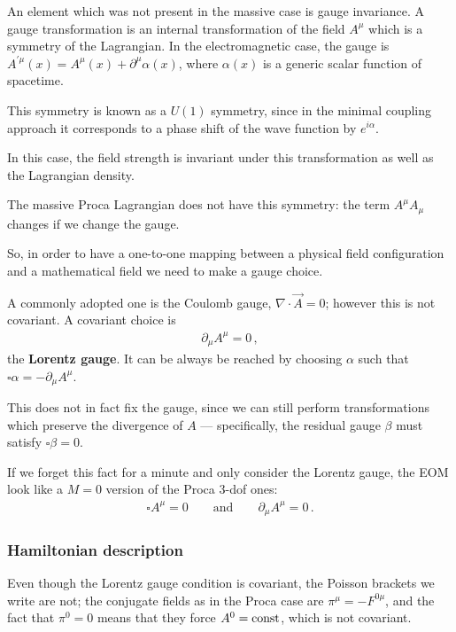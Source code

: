 \documentclass[main.tex]{subfiles}
\begin{document}
An element which was not present in the massive case is gauge invariance. A gauge transformation is an internal transformation of the field \(A^{\mu } \) which is a symmetry of the Lagrangian. In the electromagnetic case, the gauge is \(A^{\prime \mu } (x) = A^{\mu } (x) + \partial^{\mu } \alpha (x)\), where \(\alpha (x)\) is a generic scalar function of spacetime. 

This symmetry is known as a \(U(1)\) symmetry, since in the minimal coupling approach it corresponds to a phase shift of the wave function by \(e^{i \alpha }\). 

In this case, the field strength is invariant under this transformation as well as the Lagrangian density. 

The massive Proca Lagrangian does not have this symmetry: the term \(A^{\mu } A_{\mu }\) changes if we change the gauge. 

So, in order to have a one-to-one mapping between a physical field configuration and a mathematical field we need to make a gauge choice. 

A commonly adopted one is the Coulomb gauge, \(\nabla \cdot \vec{A} = 0\); however this is not covariant. A covariant choice is 
%
\begin{align}
\partial_{\mu } A^{\mu } = 0
\,,
\end{align}
%
the \textbf{Lorentz gauge}. It can be always be reached by choosing \(\alpha \) such that \(\square \alpha = - \partial_{\mu } A^{\mu }\). 

This does not in fact fix the gauge, since we can still perform transformations which preserve the divergence of \(A\) --- specifically, the residual gauge \(\beta \) must satisfy \(\square \beta = 0\). 

If we forget this fact for a minute and only consider the Lorentz gauge, the EOM look like a \(M=0\) version of the  Proca 3-dof ones: 
%
\begin{align}
\square A^{\mu } = 0 \qquad \text{and} \qquad \partial_{\mu } A^{\mu } = 0 
\,.
\end{align}

\subsubsection{Hamiltonian description}

Even though the Lorentz gauge condition is covariant, the Poisson brackets we write are not; the conjugate fields as in the Proca case are \(\pi^{\mu} = - F^{0\mu}\), and the fact that \(\pi^{0} = 0\) means that they force \(A^{0} = \text{const}\), which is not covariant. 
\end{document}
